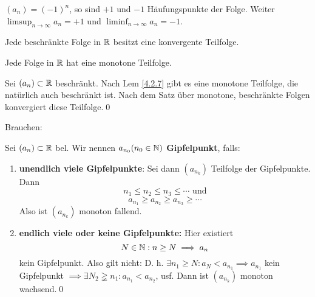 \documentclass[consecutivenumbering]{gadsescript}
\begin{document}
\begin{subexample}
	$ (a_n) = (-1)^n $, so sind $ +1 $ und $ -1 $ Häufungspunkte der Folge. Weiter $ \limsup_{n\to\infty} a_n = +1 $ und $ \liminf_{n\to\infty} a_n = -1 $.\\
\end{subexample}

\begin{subtheorem}
	Jede beschränkte Folge in $ \mathbb{R} $ besitzt eine konvergente Teilfolge.
\end{subtheorem}
\begin{sublemma}
	Jede Folge in $\mathbb{R}$ hat eine monotone Teilfolge.
\end{sublemma}
\begin{subproof*}
	Sei $ (a_n) \subset \mathbb{R} $ beschränkt. Nach Lem \ref{4.2.7} gibt es eine monotone Teilfolge, die natürlich auch beschränkt ist. Nach dem Satz über monotone, beschränkte Folgen konvergiert diese Teilfolge.\qed
\end{subproof*}
Brauchen:
\begin{subproof*}
	Sei $ (a_n) \subset \mathbb{R} $ bel. Wir nennen $ a_{n_0} (n_0 \in \mathbb{N})$ \textbf{Gipfelpunkt}, falls:
	\begin{enumerate}[label=(\roman*)]
		\item \textbf{unendlich viele Gipfelpunkte}: Sei dann $ (a_{n_k}) $ Teilfolge der Gipfelpunkte.
			Dann \[ n_1 \leq n_2 \leq n_3 \leq \dotsb \text{ und} \]
			\[ a_{n_1} \geq a_{n_2} \geq a_{n_3} \geq \dotsb \]
			Also ist $ (a_{n_k}) $ monoton fallend.
		\item \textbf{endlich viele oder keine Gipfelpunkte:} Hier existiert
			\[ N \in \mathbb{N} : n \geq N \implies a_n \] kein Gipfelpunkt. Also gilt nicht:
			D. h. $ \exists n_1 \geq N: a_N < a_{n_1} \implies a_{n_1} $ kein Gipfelpunkt $\implies \exists N_2 \gneqq n_1 : a_{n_1} < a_{n_2}$, usf. Dann ist $ (a_{n_k} ) $ monoton wachsend.\qed
	\end{enumerate}
\end{subproof*}
\end{document}
